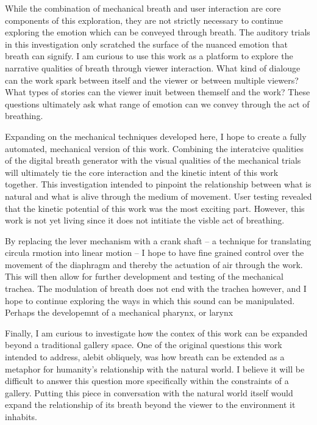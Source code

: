 \documentclass[letterpaper]{article}
\begin{document}


While the combination of mechanical breath and user interaction are core components of this exploration, they are not strictly necessary to continue exploring the emotion which can be conveyed through breath. The auditory trials in this investigation only scratched the surface of the nuanced emotion that breath can signify. I am curious to use this work as a platform to explore the narrative qualities of breath through viewer interaction. What kind of dialouge can the work spark between itself and the viewer or between multiple viewers? What types of stories can the viewer inuit between themself and the work? These questions ultimately ask what range of emotion can we convey through the act of breathing.

Expanding on the mechanical techniques developed here, I hope to create a fully automated, mechanical version of this work. Combining the interatcive qualities of the digital breath generator with the visual qualities of the mechanical trials will ultimately tie the core interaction and the kinetic intent of this work together. This investigation intended to pinpoint the relationship between what is natural and what is alive through the medium of movement. User testing revealed that the kinetic potential of this work was the most exciting part. However, this work is not yet living since it does not intitiate the visble act of breathing.

By replacing the lever mechanism with a crank shaft -- a technique for translating circula rmotion into linear motion -- I hope to have fine grained control over the movement of the diaphragm and thereby the actuation of air through the work. This will then allow for further development and testing of the mechanical trachea. The modulation of breath does not end with the trachea however, and I hope to continue exploring the ways in which this sound can be manipulated. Perhaps the developemnt of a mechanical pharynx, or larynx  

Finally, I am curious to investigate how the contex of this work can be expanded beyond a traditional gallery space. One of the original questions this work intended to address, alebit obliquely, was how breath can be extended as a metaphor for humanity's relationship with the natural world. I believe it will be difficult to answer this question more specifically within the constraints of a gallery. Putting this piece in conversation with the natural world itself would expand the relationship of its breath beyond the viewer to the environment it inhabits. 
\end{document}

